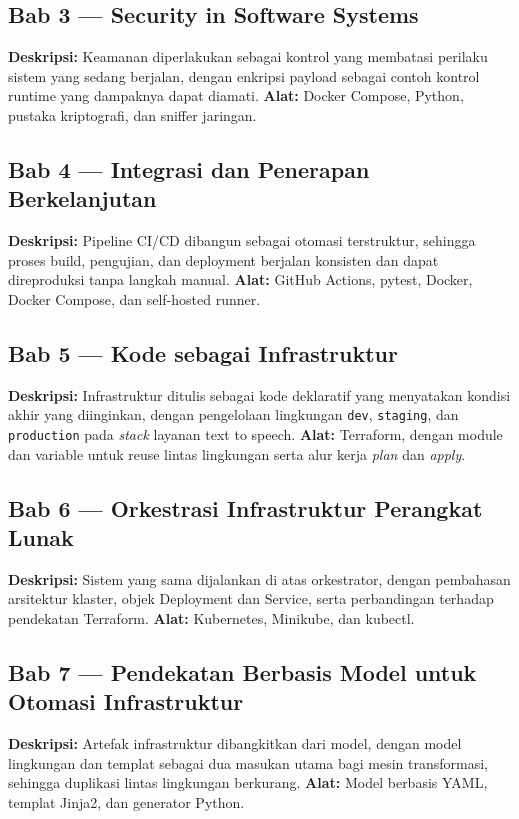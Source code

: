 \subsection*{Bab 3 --- Security in Software Systems}
\textbf{Deskripsi:} Keamanan diperlakukan sebagai kontrol yang membatasi perilaku sistem yang sedang berjalan, dengan enkripsi payload sebagai contoh kontrol runtime yang dampaknya dapat diamati.
\textbf{Alat:} Docker Compose, Python, pustaka kriptografi, dan sniffer jaringan.

\subsection*{Bab 4 --- Integrasi dan Penerapan Berkelanjutan}
\textbf{Deskripsi:} Pipeline CI/CD dibangun sebagai otomasi terstruktur, sehingga proses build, pengujian, dan deployment berjalan konsisten dan dapat direproduksi tanpa langkah manual.
\textbf{Alat:} GitHub Actions, pytest, Docker, Docker Compose, dan self-hosted runner.

\subsection*{Bab 5 --- Kode sebagai Infrastruktur}
\textbf{Deskripsi:} Infrastruktur ditulis sebagai kode deklaratif yang menyatakan kondisi akhir yang diinginkan, dengan pengelolaan lingkungan \texttt{dev}, \texttt{staging}, dan \texttt{production} pada \textit{stack} layanan text to speech.
\textbf{Alat:} Terraform, dengan module dan variable untuk reuse lintas lingkungan serta alur kerja \textit{plan} dan \textit{apply}.

\subsection*{Bab 6 --- Orkestrasi Infrastruktur Perangkat Lunak}
\textbf{Deskripsi:} Sistem yang sama dijalankan di atas orkestrator, dengan pembahasan arsitektur klaster, objek Deployment dan Service, serta perbandingan terhadap pendekatan Terraform.
\textbf{Alat:} Kubernetes, Minikube, dan kubectl.

\subsection*{Bab 7 --- Pendekatan Berbasis Model untuk Otomasi Infrastruktur}
\textbf{Deskripsi:} Artefak infrastruktur dibangkitkan dari model, dengan model lingkungan dan templat sebagai dua masukan utama bagi mesin transformasi, sehingga duplikasi lintas lingkungan berkurang.
\textbf{Alat:} Model berbasis YAML, templat Jinja2, dan generator Python.

